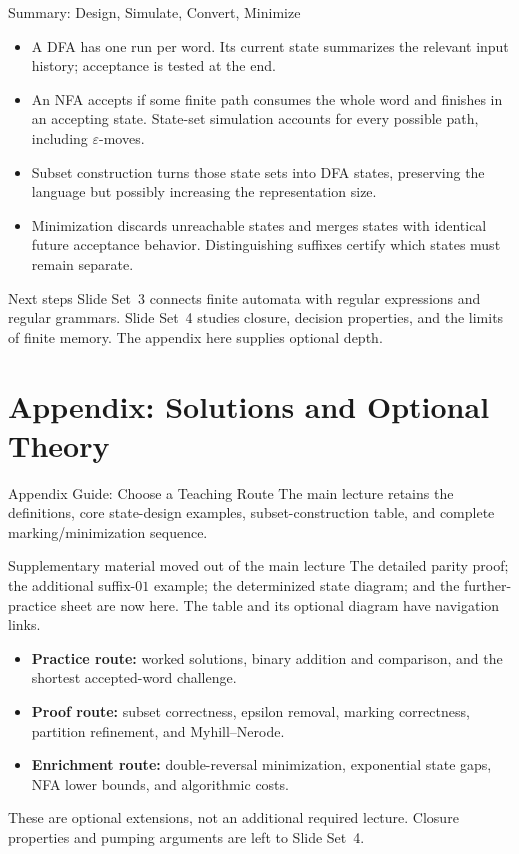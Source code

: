 \documentclass[10pt]{beamer}
\begin{document}
\begin{frame}{Summary: Design, Simulate, Convert, Minimize}
  \small
  \begin{itemize}
    \item A DFA has one run per word. Its current state summarizes the
      relevant input history; acceptance is tested at the end.
    \pause
    \item An NFA accepts if some finite path consumes the whole word and
      finishes in an accepting state. State-set simulation accounts for
      every possible path, including $\varepsilon$-moves.
    \pause
    \item Subset construction turns those state sets into DFA states,
      preserving the language but possibly increasing the representation size.
    \pause
    \item Minimization discards unreachable states and merges states with
      identical future acceptance behavior. Distinguishing suffixes certify
      which states must remain separate.
  \end{itemize}
  \begin{block}{Next steps}
    Slide Set~3 connects finite automata with regular expressions and regular
    grammars. Slide Set~4 studies closure, decision properties, and the
    limits of finite memory. The appendix here supplies optional depth.
  \end{block}
\end{frame}

\appendix
\section{Appendix: Solutions and Optional Theory}

\begin{frame}{Appendix Guide: Choose a Teaching Route}
  \small
  The main lecture retains the definitions, core state-design examples,
  subset-construction table, and complete marking/minimization sequence.
  \begin{block}{Supplementary material moved out of the main lecture}
    The detailed parity proof; the additional suffix-$01$ example; the
    determinized state diagram; and the further-practice sheet are now here.
    The table and its optional diagram have navigation links.
  \end{block}
  \begin{itemize}
    \item \textbf{Practice route:} worked solutions, binary addition and
      comparison, and the shortest accepted-word challenge.
    \item \textbf{Proof route:} subset correctness, epsilon removal,
      marking correctness, partition refinement, and Myhill--Nerode.
    \item \textbf{Enrichment route:} double-reversal minimization,
      exponential state gaps, NFA lower bounds, and algorithmic costs.
  \end{itemize}
  These are optional extensions, not an additional required lecture.
  Closure properties and pumping arguments are left to Slide Set~4.
\end{frame}
\end{document}
